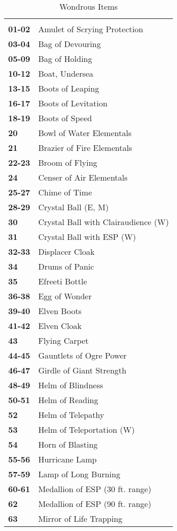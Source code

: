 \begin{multicols*}{2}
\begin {table}[H]
  \caption{Wondrous Items}
  \begin{tabularx}{\columnwidth}{>{\bfseries}YY}
	 & \\
	01-02 & Amulet of Scrying Protection\\
	03-04 & Bag of Devouring\\
	05-09 & Bag of Holding\\
	10-12 & Boat, Undersea\\
	13-15 & Boots of Leaping\\
	16-17 & Boots of Levitation\\
	18-19 & Boots of Speed\\
	20 & Bowl of Water Elementals\\
	21 & Brazier of Fire Elementals\\
	22-23 & Broom of Flying\\
	24 & Censer of Air Elementals\\
	25-27 & Chime of Time\\
	28-29 & Crystal Ball (E, M)\\
	30 & Crystal Ball with Clairaudience  (W)\\
	31 & Crystal Ball with ESP (W)\\
	32-33 & Displacer Cloak\\
	34 & Drums of Panic\\
	35 & Efreeti Bottle\\
	36-38 & Egg of Wonder\\
	39-40 & Elven Boots\\
	41-42 & Elven Cloak\\
	43 & Flying Carpet\\
	44-45 & Gauntlets of Ogre Power\\
	46-47 & Girdle of Giant Strength\\
	48-49 & Helm of Blindness\\
	50-51 & Helm of Reading\\
	52 & Helm of Telepathy\\
	53 & Helm of Teleportation (W)\\
	54 & Horn of Blasting\\
	55-56 & Hurricane Lamp\\
	57-59 & Lamp of Long Burning\\
	60-61 & Medallion of ESP (30 ft. range)\\
	62 & Medallion of ESP (90 ft. range)\\
	63 & Mirror of Life Trapping\\

\end{tabularx}
\end{table}
\end{multicols*}
